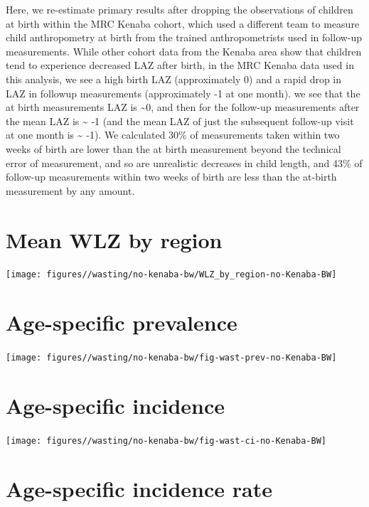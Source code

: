 \documentclass[
  9pt,
]{book}
\begin{document}
Here, we re-estimate primary results after dropping the observations of children at birth within the MRC Kenaba cohort, which used a different team to measure child anthropometry at birth from the trained anthropometrists used in follow-up measurements. While other cohort data from the Kenaba area show that children tend to experience decreased LAZ after birth, in the MRC Kenaba data used in this analysis, we see a high birth LAZ (approximately 0) and a rapid drop in LAZ in followup measurements (approximately -1 at one month).
we see that the at birth measurements LAZ is \textasciitilde0, and then for the follow-up measurements after the mean LAZ is \textasciitilde{} -1 (and the mean LAZ of just the subsequent follow-up visit at one month is \textasciitilde{} -1). We calculated 30\% of measurements taken within two weeks of birth are lower than the at birth measurement beyond the technical error of measurement, and so are unrealistic decreases in child length, and 43\% of follow-up measurements within two weeks of birth are less than the at-birth measurement by any amount.

\hypertarget{mean-wlz-by-region}{%
\section{Mean WLZ by region}\label{mean-wlz-by-region}}

\texttt{[image: figures//wasting/no-kenaba-bw/WLZ\_by\_region-no-Kenaba-BW]}

\hypertarget{age-specific-prevalence-2}{%
\section{Age-specific prevalence}\label{age-specific-prevalence-2}}

\texttt{[image: figures//wasting/no-kenaba-bw/fig-wast-prev-no-Kenaba-BW]}

\hypertarget{age-specific-incidence-1}{%
\section{Age-specific incidence}\label{age-specific-incidence-1}}

\texttt{[image: figures//wasting/no-kenaba-bw/fig-wast-ci-no-Kenaba-BW]}

\hypertarget{age-specific-incidence-rate-1}{%
\section{Age-specific incidence rate}\label{age-specific-incidence-rate-1}}
\end{document}
